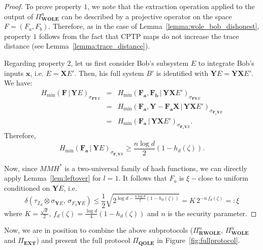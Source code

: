 \begin{proof}

 To prove property $1$, we note that the extraction operation applied to the output of $\Pi^n_{\textbf{WOLE}}$ can be described by a projective operator on the space  $F = (F_{a}, F_{b})$. Therefore, as in the case of  Lemma~\ref{lemma:wole_bob_dishonest}, property $1$ follows from  the fact that CPTP maps do not increase the trace distance (see Lemma~\ref{lemma:trace_distance}).

Regarding property $2$,  let us first consider Bob's subsystem $E$  to integrate Bob's inputs $\bm{x}$, i.e. $E = \mathbf{X} E'$. Then, his full system $B'$ is identified with $\mathbf{Y} E=\mathbf{Y}\mathbf{X} E'$. We have:
\begin{eqnarray*}
H_{\min}(\mathbf{F}\, | \, \mathbf{Y} E)_{\sigma_{\mathbf{F}\mathbf{Y}E}} &=& H_{\min}(\mathbf{F}_{\bm{a}}, \mathbf{F}_{\bm{b}} \, | \, \mathbf{Y} \mathbf{X} E')_{\sigma_{\mathbf{F}\mathbf{Y}E}} \\
&=& H_{\min}(\mathbf{F}_{\bm{a}}, \mathbf{Y} - \mathbf{F}_{\bm{a}} \mathbf{X} \, | \, \mathbf{Y} \mathbf{X} E')_{\sigma_{\mathbf{F}_a\mathbf{Y}E}} \\
&=& H_{\min}(\mathbf{F}_{\bm{a}}\, | \, \mathbf{Y} \mathbf{X} E')_{\sigma_{\mathbf{F}_a\mathbf{Y}E}}.
\end{eqnarray*}
Therefore, 
$$H_{\min}(\mathbf{F}_{\bm{a}}\, | \, \mathbf{Y} E)_{\sigma_{\mathbf{F}_a\mathbf{Y}E}} \geq \frac{n\log d}{2} (1 - h_d(\zeta)).$$

Now, since $MMH^*$ is a two-universal family of hash functions, we can directly apply  Lemma~\ref{lem:leftover} for $l=1$. It follows that $F_a$ is $\xi-$close to uniform conditioned on $\mathbf{Y} E$, i.e.
$$\delta( \tau_{\mathbb{Z}_d} \otimes \sigma_{\mathbf{Y} E},\, \sigma_{F_{a} \mathbf{Y} E} ) \leq \frac{1}{2}\sqrt{2^{\log d - \frac{n\log d}{2}(1 - h_d(\zeta))}} = K\, 2^{-n \, f_d(\zeta)} =: \xi$$
where $K = \frac{\sqrt{d}}{2}$, $f_d(\zeta) = \frac{\log d}{4} (1-h_d(\zeta))$ and $n$ is the security parameter.

\end{proof}

Now, we are in position to combine the above subprotocols ($\Pi^n_{\textbf{RWOLE}}$, $\Pi^n_{\textbf{WOLE}}$ and $\Pi_{\textbf{EXT}}$) and present the full protocol $\Pi_{\textbf{QOLE}}$ in Figure~\ref{fig:fullprotocol}. 



